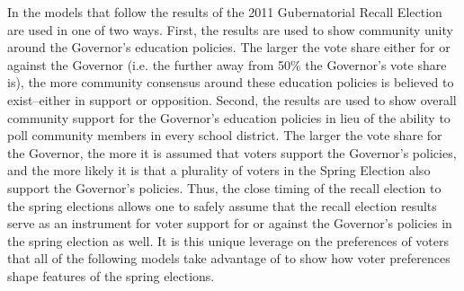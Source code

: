 In the models that follow the results of the 2011 Gubernatorial Recall Election are used in one of two ways. First, the results are used to show community unity around the Governor's education policies. The larger the vote share either for or against the Governor (i.e. the further away from 50\% the Governor's vote share is), the more community consensus around these education policies is believed to exist--either in support or opposition. Second, the results are used to show overall community support for the Governor's education policies in lieu of the ability to poll community members in every school district. The larger the vote share for the Governor, the more it is assumed that voters support the Governor's policies, and the more likely it is that a plurality of voters in the Spring Election also support the Governor's policies. Thus, the close timing of the recall election to the spring elections allows one to safely assume that the recall election results serve as an instrument for voter support for or against the Governor's policies in the spring election as well. It is this unique leverage on the preferences of voters that all of the following models take advantage of to show how voter preferences shape features of the spring elections. 
% 
% 
